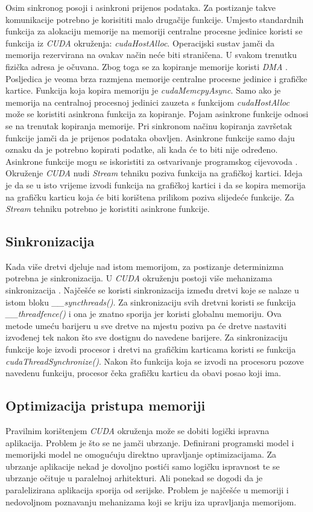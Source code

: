 \documentclass[times, utf8, zavrsni, numeric, sort]{fer}
\begin{document}
Osim sinkronog posoji i asinkroni prijenos podataka. Za postizanje takve komunikacije potrebno je korisititi malo drugačije funkcije. Umjesto standardnih funkcija za alokaciju memorije na memoriji centralne procesne jedinice koristi se funkcija iz \emph{CUDA} okruženja: \emph{cudaHostAlloc}. Operacijski sustav jamči da memorija rezervirana na ovakav način neće biti straničena. U svakom trenutku fizička adresa je očuvana. Zbog toga se za kopiranje memorije koristi \emph{DMA} . Posljedica je veoma brza razmjena memorije centralne procesne jedinice i grafičke kartice. Funkcija koja kopira memoriju je \emph{cudaMemcpyAsync}. Samo ako je memorija na centralnoj procesnoj jedinici zauzeta s funkcijom \emph{cudaHostAlloc} može se koristiti asinkrona funkcija za kopiranje. Pojam asinkrone funkcije odnosi se na trenutak kopiranja memorije. Pri sinkronom načinu kopiranja završetak funkcije jamči da je prijenos podataka obavljen. Asinkrone funkcije samo daju oznaku da je potrebno kopirati podatke, ali kada će to biti nije određeno. Asinkrone funkcije mogu se iskoristiti za ostvarivanje programskog cijevovoda . Okruženje \emph{CUDA} nudi \emph{Stream} tehniku poziva funkcija na grafičkoj kartici. Ideja je da se u isto vrijeme izvodi funkcija na grafičkoj kartici i da se kopira memorija na grafičku karticu koja će biti korištena prilikom poziva slijedeće funkcije. Za \emph{Stream} tehniku potrebno je koristiti asinkrone funkcije.

\subsection{Sinkronizacija}
Kada više dretvi djeluje nad istom memorijom, za postizanje determinizma potrebna je sinkronizacija. U \emph{CUDA} okruženju postoji više mehanizama sinkronizacija \cite{cudaguide}. Najčešće se koristi sinkronizacija između dretvi koje se nalaze u istom bloku \emph{\_\_syncthreads()}. Za sinkronizaciju svih dretvni koristi se funkcija \emph{\_\_threadfence()} i ona je znatno sporija jer koristi globalnu memoriju. Ova metode umeću barijeru u sve dretve na mjestu poziva pa će dretve nastaviti izvođenej tek nakon što sve dostignu do navedene barijere. Za sinkronizaciju funkcije koje izvodi procesor i dretvi na grafičkim karticama koristi se funkcija \emph{cudaThreadSynchronize()}. Nakon što funkcija koja se izvodi na procesoru pozove navedenu funkciju, procesor čeka grafičku karticu da obavi posao koji ima.

\subsection{Optimizacija pristupa memoriji}
Pravilnim korištenjem \emph{CUDA} okruženja može se dobiti logički ispravna aplikacija. Problem je što se ne jamči ubrzanje. Definirani programski model i memorijski model ne omogućuju direktno upravljanje optimizacijama. Za ubrzanje aplikacije nekad je dovoljno postići samo logičku ispravnost te se ubrzanje očituje u paralelnoj arhitekturi. Ali ponekad se dogodi da je paralelizirana aplikacija sporija od serijske. Problem je najčešće u memoriji i nedovoljnom poznavanju mehanizama koji se kriju iza upravljanja memorijom.
\end{document}
